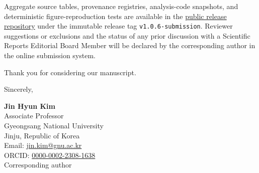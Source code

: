 \documentclass[11pt,a4paper]{article}
\begin{document}
Aggregate source tables, provenance registries, analysis-code snapshots, and deterministic
figure-reproduction tests are available in the
\href{https://github.com/AiXLab-GNU/evidence-qualified-alignment-prostate-cancer}{public release repository} under the
immutable release tag \texttt{v1.0.6-submission}. Reviewer suggestions or exclusions and the
status of any prior discussion with a Scientific Reports Editorial Board Member will be
declared by the corresponding author in the online submission system.

Thank you for considering our manuscript.

Sincerely,

\textbf{Jin Hyun Kim}\\
Associate Professor\\
Gyeongsang National University\\
Jinju, Republic of Korea\\
Email: \href{mailto:jin.kim@gnu.ac.kr}{jin.kim@gnu.ac.kr}\\
ORCID: \href{https://orcid.org/0000-0002-2308-1638}{0000-0002-2308-1638}\\
Corresponding author
\end{document}
